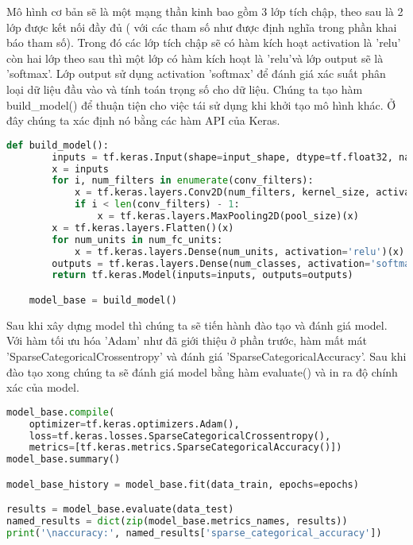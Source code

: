 Mô hình cơ bản sẽ là một mạng thần kinh bao gồm 3 lớp tích chập, theo sau là 2 lớp được kết nối đầy đủ ( với các tham số như được định nghĩa trong phần khai báo tham số). 
Trong đó các lớp tích chập sẽ có hàm kích hoạt activation là 'relu' còn hai lớp theo sau thì một lớp có hàm kích hoạt là 'relu'và lớp output sẽ là 'softmax'. Lớp output sử dụng 
activation 'softmax' để đánh giá xác suất phân loại dữ liệu đầu vào và tính toán trọng số cho dữ liệu.
Chúng ta tạo hàm build\_model() để thuận tiện cho việc tái sử dụng khi khởi tạo mô hình khác. 
Ở đây chúng ta xác định nó bằng các hàm API của Keras. 

\begin{lstlisting}[language=Python]
    def build_model():
        inputs = tf.keras.Input(shape=input_shape, dtype=tf.float32, name='image')
        x = inputs
        for i, num_filters in enumerate(conv_filters):
            x = tf.keras.layers.Conv2D(num_filters, kernel_size, activation='relu')(x)
            if i < len(conv_filters) - 1:
                x = tf.keras.layers.MaxPooling2D(pool_size)(x)
        x = tf.keras.layers.Flatten()(x)
        for num_units in num_fc_units:
            x = tf.keras.layers.Dense(num_units, activation='relu')(x)
        outputs = tf.keras.layers.Dense(num_classes, activation='softmax')(x)
        return tf.keras.Model(inputs=inputs, outputs=outputs)

    model_base = build_model()
\end{lstlisting}

Sau khi xây dựng model thì chúng ta sẽ tiến hành đào tạo và đánh giá model. Với hàm tối ưu hóa 'Adam' như đã giới thiệu ở phần trước, hàm mất mát 'SparseCategoricalCrossentropy'
và đánh giá 'SparseCategoricalAccuracy'. Sau khi đào tạo xong chúng ta sẽ đánh giá model bằng hàm evaluate() và in ra độ chính xác của model.

\begin{lstlisting}[language=Python]
model_base.compile(
    optimizer=tf.keras.optimizers.Adam(),
    loss=tf.keras.losses.SparseCategoricalCrossentropy(),
    metrics=[tf.keras.metrics.SparseCategoricalAccuracy()])
model_base.summary()

model_base_history = model_base.fit(data_train, epochs=epochs)

results = model_base.evaluate(data_test)
named_results = dict(zip(model_base.metrics_names, results))
print('\naccuracy:', named_results['sparse_categorical_accuracy'])

\end{lstlisting}

